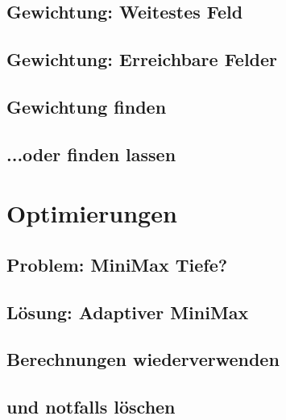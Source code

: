 \documentclass[12pt, draft]{beamer}
\begin{document}
\subsection{Gewichtung: Weitestes Feld} \begin{frame}\end{frame}
\subsection{Gewichtung: Erreichbare Felder} \begin{frame}\end{frame}
\subsection{Gewichtung finden} \begin{frame}\end{frame}
\subsection{...oder finden lassen} \begin{frame}\end{frame}

\section{Optimierungen}
\subsection{Problem: MiniMax Tiefe?} \begin{frame}\end{frame}
\subsection{Lösung: Adaptiver MiniMax} \begin{frame}\end{frame}
\subsection{Berechnungen wiederverwenden} \begin{frame}\end{frame}
\subsection{und notfalls löschen} \begin{frame}\end{frame}
\end{document}
